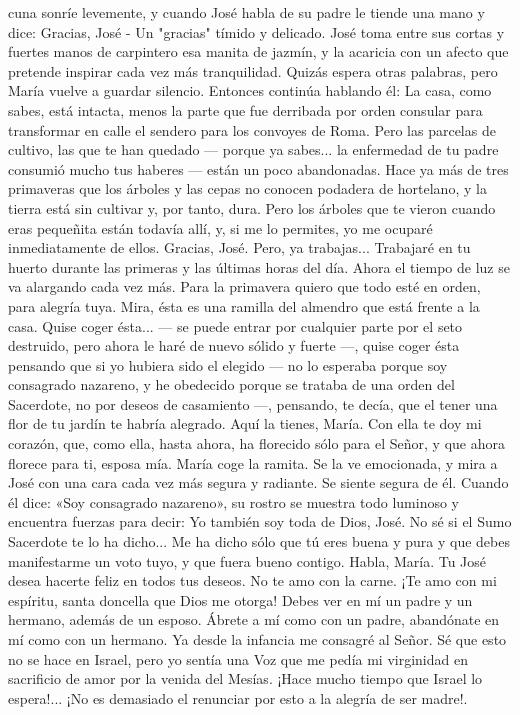 \documentclass[12pt]{book} %
\begin{document}
cuna sonríe levemente, y cuando José habla de su padre le tiende una mano y dice: 
Gracias, José - Un "gracias" tímido y delicado. 
José toma entre sus cortas y fuertes manos de carpintero esa manita de jazmín, y la acaricia con un afecto que pretende inspirar cada vez más tranquilidad. Quizás espera otras palabras, pero María vuelve a guardar silencio. Entonces continúa hablando él: 
La casa, como sabes, está intacta, menos la parte que fue derribada por orden consular para transformar en calle el 
sendero para los convoyes de Roma. Pero las parcelas de cultivo, las que te han quedado — porque ya sabes... la enfermedad de tu padre consumió mucho tus haberes — están un poco abandonadas. Hace ya más de tres primaveras que los árboles y las cepas no conocen podadera de hortelano, y la tierra está sin cultivar y, por tanto, dura. Pero los árboles que te vieron cuando eras pequeñita están todavía allí, y, si me lo permites, yo me ocuparé inmediatamente de ellos. 
Gracias, José. Pero, ya trabajas... 
Trabajaré en tu huerto durante las primeras y las últimas horas del día. Ahora el tiempo de luz se va alargando cada vez más. Para la primavera quiero que todo esté en orden, para alegría tuya. Mira, ésta es una ramilla del almendro que está frente a la casa. Quise coger ésta... — se puede entrar por cualquier parte por el seto destruido, pero ahora le haré de nuevo sólido y fuerte —, quise coger ésta pensando que si yo hubiera sido el elegido — no lo esperaba porque soy consagrado nazareno, y he obedecido porque se trataba de una orden del Sacerdote, no por deseos de casamiento —, pensando, te decía, que el tener una flor de tu jardín te habría alegrado. Aquí la tienes, María. Con ella te doy mi corazón, que, como ella, hasta ahora, ha florecido sólo para el Señor, y que ahora florece para ti, esposa mía. 
María coge la ramita. Se la ve emocionada, y mira a José con una cara cada vez más segura y radiante. Se siente segura 
de él. Cuando él dice: «Soy consagrado nazareno», su rostro se muestra todo luminoso y encuentra fuerzas para decir: 
Yo también soy toda de Dios, José. No sé si el Sumo Sacerdote te lo ha dicho... 
Me ha dicho sólo que tú eres buena y pura y que debes manifestarme un voto tuyo, y que fuera bueno contigo. Habla, María. Tu José desea hacerte feliz en todos tus deseos. No te amo con la carne. ¡Te amo con mi espíritu, santa doncella que Dios me otorga! Debes ver en mí un padre y un hermano, además de un esposo. Ábrete a mí como con un padre, abandónate en mí como con un hermano. 
Ya desde la infancia me consagré al Señor. Sé que esto no se hace en Israel, pero yo sentía una Voz que me pedía mi virginidad en sacrificio de amor por la venida del Mesías. ¡Hace mucho tiempo que Israel lo espera!... ¡No es demasiado el renunciar por esto a la alegría de ser madre!. 
\end{document}

